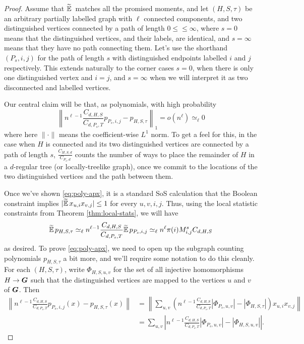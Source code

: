 \begin{proof}
    Assume that $\widetilde{\operatorname*{\mathbb{E}}}\,$ matches all the promised moments, and let $(H,S,\tau)$ be an arbitrary partially labelled graph with $\ell$ connected components, and two distinguished vertices connected by a path of length $0 \le \le \infty$, where $s = 0$ means that the distinguished vertices, and their labels, are identical, and $s = \infty$ means that they have no path connecting them. Let's use the shorthand $(P_s,i,j)$ for the path of length $s$ with distinguished endpoints labelled $i$ and $j$ respectively. This extends naturally to the corner cases $s = 0$, when there is only one distinguished vertex and $i = j$, and $s = \infty$ when we will interpret it as two disconnected and labelled vertices.

    Our central claim will be that, as polynomials, with high probability
    \begin{equation} \label{eq:poly-apx}
        \left\| n^{\ell - 1}\frac{C_{d,H,S}}{C_{d,P_s,T}}p_{P_s,i,j} - p_{H,S,\tau} \right\|_1 = o(n^\ell) \simeq_\ell 0
    \end{equation}
    where here $\|\cdot \|$ means the coefficient-wise $L^1$ norm. To get a feel for this, in the case when $H$ is connected and its two distinguished vertices are connected by a path of length $s$, $\tfrac{C_{H,S,d}}{C_{P_s,d}}$ counts the number of ways to place the remainder of $H$ in a $d$-regular tree (or locally-treelike graph), once we commit to the locations of the two distinguished vertices and the path between them. 

    Once we've shown \eqref{eq:poly-apx}, it is a standard SoS calculation that the Boolean constraint implies $|\widetilde{\operatorname*{\mathbb{E}}}\, x_{u,i}x_{v,j}| \le 1$ for every $u,v,i,j$. Thus, using the local statistic constraints from Theorem \ref{thm:local-stats}, we will have
    $$
        \widetilde{\operatorname*{\mathbb{E}}}\, p_{H,S,\tau} \simeq_\ell n^{\ell - 1}\frac{C_{d,H,S}}{C_{d,P_s,T}} \widetilde{\operatorname*{\mathbb{E}}}\, p_{P_s,i,j} \simeq_\ell n^\ell \pi(i)M_{i,j}^s C_{d,H,S}
    $$
    as desired. To prove \eqref{eq:poly-apx}, we need to open up the subgraph counting polynomials $p_{H,S,\tau}$ a bit more, and we'll require some notation to do this cleanly. For each $(H,S,\tau)$, write $\Phi_{H,S,u,v}$ for the set of all injective homomorphisms $H \to \boldsymbol{G}$ such that the distinguished vertices are mapped to the vertices $u$ and $v$ of $\boldsymbol{G}$. Then
    \begin{align*}
        \left\|n^{\ell - 1}\frac{C_{d,H,S}}{C_{d,P_s,T}} p_{P_s,i,j}(x) - p_{H,S,\tau}(x)\right\|
        &= \left\|\sum_{u,v} \left(n^{\ell - 1}\frac{C_{d,H,S}}{C_{d,P_s,T}}|\Phi_{P_s,u,v}| - |\Phi_{H,S,\tau}| \right) x_{u,i}x_{v,j}\right\| \\
        &= \sum_{u,v} \left|n^{\ell - 1}\frac{C_{d,H,S}}{C_{d,P_s,T}}|\Phi_{P_s,u,v}| - |\Phi_{H,S,u,v}| \right|.
    \end{align*}


\end{proof}
